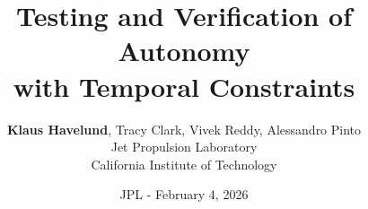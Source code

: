 \documentclass{beamer}
\title{Testing and Verification of Autonomy\\ with Temporal Constraints}
\author{{\bf Klaus Havelund}, Tracy Clark, Vivek Reddy, Alessandro Pinto\\
Jet Propulsion Laboratory\\
California Institute of Technology\\
}
\date[]{JPL - February 4, 2026}
\begin{document}
\begin{frame}
  \titlepage
\end{frame}




%



%


\end{document}
